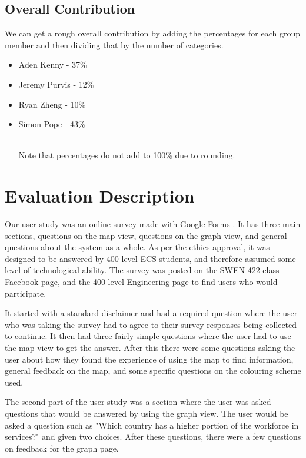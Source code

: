 \documentclass[10pt, journal]{IEEEtran}
\begin{document}
\subsection{Overall Contribution}

We can get a rough overall contribution by adding the percentages for each group member and then dividing that by the number of categories.
\begin{itemize}

\item{Aden Kenny - 37\%}
\item{Jeremy Purvis - 12\%}
\item{Ryan Zheng - 10\%}
\item{Simon Pope - 43\%}

~\\
Note that percentages do not add to 100\% due to rounding.

\end{itemize}



\section{Evaluation Description}

Our user study \cite{eval} was an online survey made with Google Forms \cite{forms}. It has three main sections, questions on the map view, questions on the graph view, and general questions about the system as a whole. As per the ethics approval, it was designed to be answered by 400-level ECS students, and therefore assumed some level of technological ability. The survey was posted on the SWEN 422 class Facebook page, and the 400-level Engineering page to find users who would participate.

It started with a standard disclaimer and had a required question where the user who was taking the survey had to agree to their survey responses being collected to continue. It then had three fairly simple questions where the user had to use the map view to get the answer. After this there were some questions asking the user about how they found the experience of using the map to find information, general feedback on the map, and some specific questions on the colouring scheme used.

The second part of the user study was a section where the user was asked questions that would be answered by using the graph view. The user would be asked a question such as "Which country has a higher portion of the workforce in services?" and given two choices. After these questions, there were a few questions on feedback for the graph page.
\end{document}
